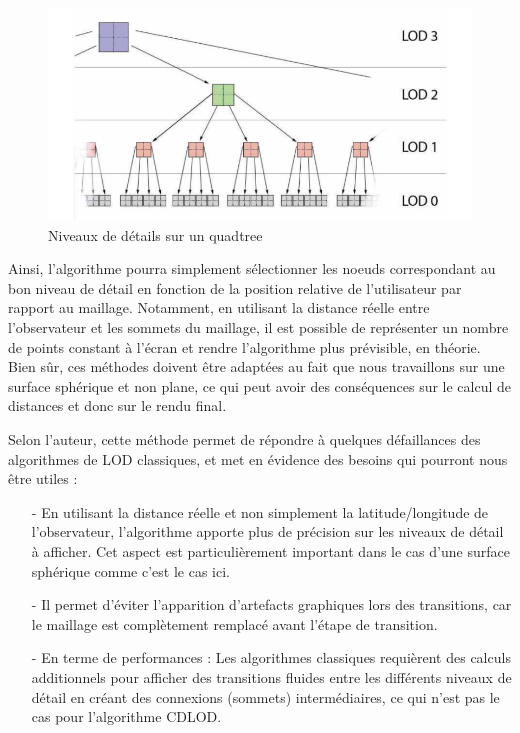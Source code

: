 \documentclass[12pt]{report}
\begin{document}
\begin{figure}[h]
\centering
\includegraphics[scale = 0.8]{images/CDLOD1.png}
\caption{Niveaux de détails sur un quadtree}
\end{figure}

\newpage

Ainsi, l'algorithme pourra simplement sélectionner les noeuds correspondant au bon niveau de détail en fonction de la position relative de l'utilisateur par rapport au maillage. Notamment, en utilisant la distance réelle entre l'observateur et les sommets du maillage, il est possible de représenter un nombre de points constant à l'écran et rendre l'algorithme plus prévisible, en théorie. Bien sûr, ces méthodes doivent être adaptées au fait que nous travaillons sur une surface sphérique et non plane, ce qui peut avoir des conséquences sur le calcul de distances et donc sur le rendu final.

Selon l'auteur, cette méthode permet de répondre à quelques défaillances des algorithmes de LOD classiques, et met en évidence des besoins qui pourront nous être utiles :

\begin{itemize}
    \item[-] En utilisant la distance réelle et non simplement la latitude/longitude de l'observateur, l'algorithme apporte plus de précision sur les niveaux de détail à afficher. Cet aspect est particulièrement important dans le cas d'une surface sphérique comme c'est le cas ici.
    \item[-] Il permet d'éviter l'apparition d'artefacts graphiques lors des transitions, car le maillage est complètement remplacé avant l'étape de transition.
    \item[-] En terme de performances : Les algorithmes classiques requièrent des calculs additionnels pour afficher des transitions fluides entre les différents niveaux de détail en créant des connexions (sommets) intermédiaires, ce qui n'est pas le cas pour l'algorithme CDLOD.
\end{itemize}
\end{document}
